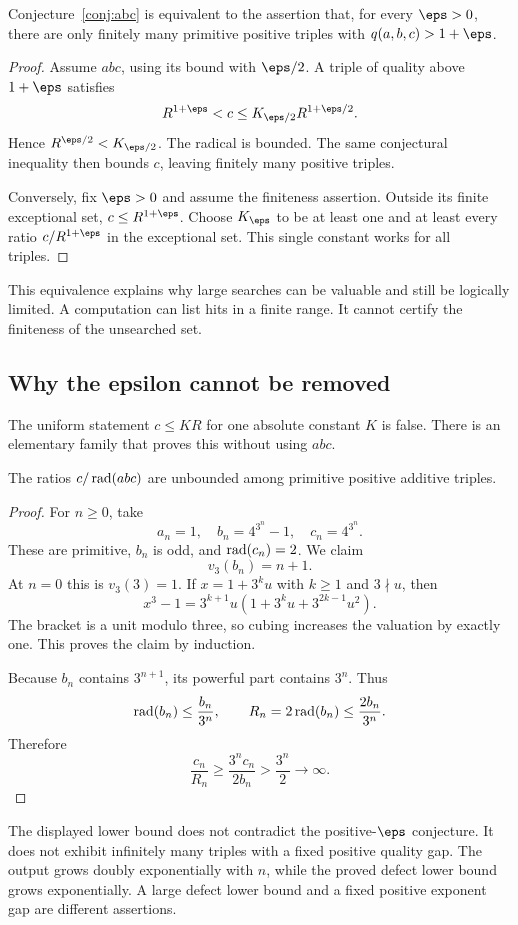 
\begin{proposition}
Conjecture~\ref{conj:abc} is equivalent to the assertion that, for every $\eps>0$, there are only finitely many primitive positive triples with $q(a,b,c)>1+\eps$.
\end{proposition}
\begin{proof}
Assume $abc$, using its bound with $\eps/2$. A triple of quality above $1+\eps$ satisfies
\[
 R^{1+\eps}<c\le K_{\eps/2}R^{1+\eps/2}.
\]
Hence $R^{\eps/2}<K_{\eps/2}$. The radical is bounded. The same conjectural inequality then bounds $c$, leaving finitely many positive triples.

Conversely, fix $\eps>0$ and assume the finiteness assertion. Outside its finite exceptional set, $c\le R^{1+\eps}$. Choose $K_\eps$ to be at least one and at least every ratio $c/R^{1+\eps}$ in the exceptional set. This single constant works for all triples.
\end{proof}
This equivalence explains why large searches can be valuable and still be logically limited. A computation can list hits in a finite range. It cannot certify the finiteness of the unsearched set.

\subsection{Why the epsilon cannot be removed}
The uniform statement $c\le KR$ for one absolute constant $K$ is false. There is an elementary family that proves this without using $abc$.
\begin{theorem}\label{thm:epsilon-zero}
The ratios $c/\operatorname{rad}(abc)$ are unbounded among primitive positive additive triples.
\end{theorem}
\begin{proof}
For $n\ge0$, take
\[
 a_n=1,\quad b_n=4^{3^n}-1,\quad c_n=4^{3^n}.
\]
These are primitive, $b_n$ is odd, and $\operatorname{rad}(c_n)=2$. We claim
\[
 v_3(b_n)=n+1.
\]
At $n=0$ this is $v_3(3)=1$. If $x=1+3^ku$ with $k\ge1$ and $3\nmid u$, then
\[
 x^3-1=3^{k+1}u\left(1+3^ku+3^{2k-1}u^2\right).
\]
The bracket is a unit modulo three, so cubing increases the valuation by exactly one. This proves the claim by induction.

Because $b_n$ contains $3^{n+1}$, its powerful part contains $3^n$. Thus
\[
 \operatorname{rad}(b_n)\le \frac{b_n}{3^n},\qquad
 R_n=2\operatorname{rad}(b_n)\le\frac{2b_n}{3^n}.
\]
Therefore
\[
 \frac{c_n}{R_n}\ge\frac{3^n c_n}{2b_n}>\frac{3^n}{2}\longrightarrow\infty.
\]
\end{proof}
The displayed lower bound does not contradict the positive-$\eps$ conjecture. It does not exhibit infinitely many triples with a fixed positive quality gap. The output grows doubly exponentially with $n$, while the proved defect lower bound grows exponentially. A large defect lower bound and a fixed positive exponent gap are different assertions.

